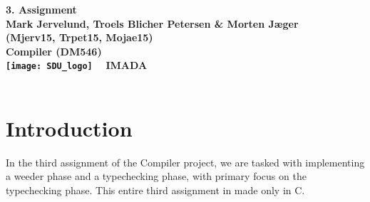 \documentclass[a4paper,10pt,titlepage]{report}
\begin{document}
\begin{titlepage}
\centering
    \vspace*{9\baselineskip}
    \huge
    \bfseries
    3. Assignment \\
    \normalfont 
    Mark Jervelund, Troels Blicher Petersen \& Morten Jæger  \\
    (Mjerv15, Trpet15, Mojae15) \\
	\huge    
    Compiler (DM546)  \\[4\baselineskip]
    \normalfont
	\texttt{[image: SDU\_logo]}
    \vfill\ 
    \vspace{5mm}
    IMADA \\

    \textbf{\datedate} \\[2\baselineskip]
\end{titlepage}

\renewcommand{\thepage}{\roman{page}}%
\tableofcontents
\newpage
\setcounter{page}{1}
\renewcommand{\thepage}{\arabic{page}}
\newpage

\section{Introduction}
In the third assignment of the Compiler project, we are tasked with implementing a weeder phase and a typechecking phase, with primary focus on the typechecking phase. This entire third assignment in made only in C.
\end{document}
